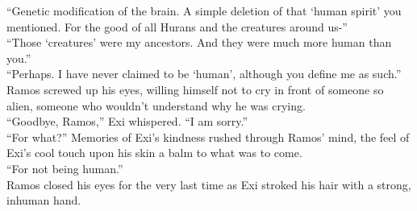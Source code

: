 “Genetic modification of the brain. A simple deletion of that ‘human spirit’ you mentioned. For the good of all Hurans and the creatures around us-”\\
“Those ‘creatures’ were my ancestors. And they were much more human than you.”\\
“Perhaps. I have never claimed to be ‘human’, although you define me as such.”\\
Ramos screwed up his eyes, willing himself not to cry in front of someone so alien, someone who wouldn’t understand why he was crying.\\
“Goodbye, Ramos,” Exi whispered. “I am sorry.”\\
“For what?” Memories of Exi’s kindness rushed through Ramos’ mind, the feel of Exi’s cool touch upon his skin a balm to what was to come.\\
“For not being human.”\\
Ramos closed his eyes for the very last time as Exi stroked his hair with a strong, inhuman hand.